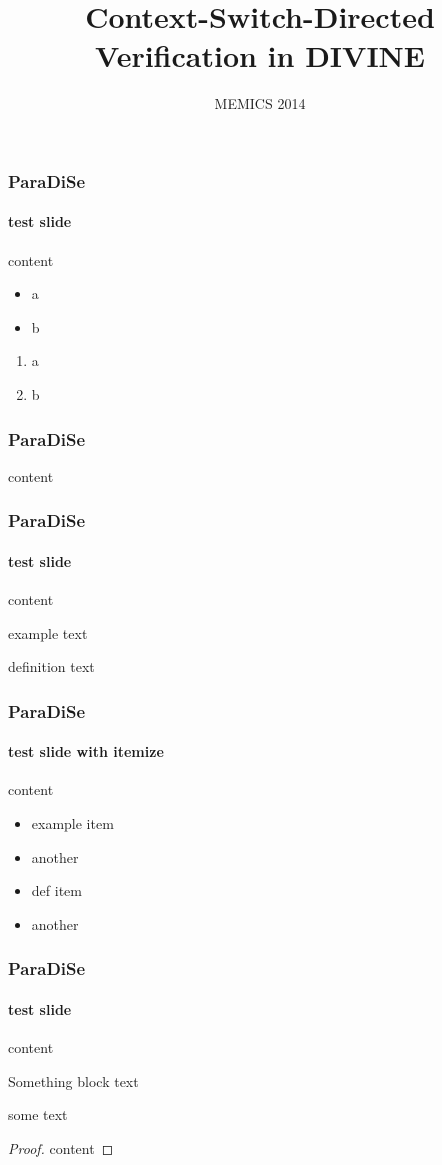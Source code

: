 \documentclass{paradise-slide}
\title{Context-Switch-Directed Verification in DIVINE}
\subtitle{MEMICS 2014}
\author[Vladimír Štill et. al.]{%
    \makebox[0.3\textwidth][c]{\textbf{Vladimír Štill}}%
    \makebox[0.3\textwidth][c]{Petr Ročkai}%
    \makebox[0.3\textwidth][c]{Jiří Barnat}%
}
\begin{document}
\maketitle

\begin{frame}
    \frametitle{ParaDiSe}
    \framesubtitle{test slide}
    content
    \begin{itemize}
        \item a
        \item b
    \end{itemize}

    \begin{enumerate}
        \item a
        \item b
    \end{enumerate}
\end{frame}

\begin{frame}
    \frametitle{ParaDiSe}
    content
\end{frame}

\begin{frame}
    \frametitle{ParaDiSe}
    \framesubtitle{test slide}
    content

    \begin{example}
        example text
    \end{example}

    \begin{definition}
        definition text
    \end{definition}
\end{frame}

\begin{frame}
    \frametitle{ParaDiSe}
    \framesubtitle{test slide with itemize}
    content

    \begin{example}
        \begin{itemize}
            \item example item
            \item another
        \end{itemize}
    \end{example}

    \begin{definition}
        \begin{itemize}
            \item def item
            \item another
        \end{itemize}
    \end{definition}
\end{frame}

\begin{frame}
    \frametitle{ParaDiSe}
    \framesubtitle{test slide}
    content

    \begin{block}{Something}
        block text
    \end{block}

    some text

    \begin{proof}
        content
    \end{proof}
\end{frame}
\end{document}
